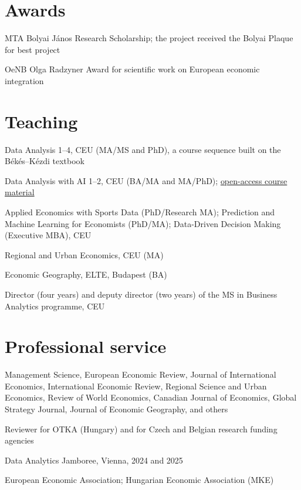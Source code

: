 \documentclass[10pt,a4paper]{article}
\begin{document}
\section{Awards}
\begin{cvlist}
  \item[2013--2016] MTA Bolyai János Research Scholarship; the project received the Bolyai Plaque for best project
  \item[2008] OeNB Olga Radzyner Award for scientific work on European economic integration
\end{cvlist}

\section{Teaching}
\begin{cvlist}
  \item[2013--] Data Analysis 1--4, CEU (MA/MS and PhD), a course sequence built on the Békés--Kézdi textbook
  \item[] Data Analysis with AI 1--2, CEU (BA/MA and MA/PhD); \href{https://gabors-data-analysis.com/ai-course/}{open-access course material}
  \item[] Applied Economics with Sports Data (PhD/Research MA); Prediction and Machine Learning for Economists (PhD/MA); Data-Driven Decision Making (Executive MBA), CEU
  \item[2011--2016] Regional and Urban Economics, CEU (MA)
  \item[2010--2014] Economic Geography, ELTE, Budapest (BA)
  \item[] Director (four years) and deputy director (two years) of the MS in Business Analytics programme, CEU
\end{cvlist}

\section{Professional service}
\begin{cvlist}
  \item[Referee] Management Science, European Economic Review, Journal of International Economics, International Economic Review, Regional Science and Urban Economics, Review of World Economics, Canadian Journal of Economics, Global Strategy Journal, Journal of Economic Geography, and others
  \item[Grants] Reviewer for OTKA (Hungary) and for Czech and Belgian research funding agencies
  \item[Organizer] Data Analytics Jamboree, Vienna, 2024 and 2025
  \item[Member] European Economic Association; Hungarian Economic Association (MKE)
\end{cvlist}
\end{document}
